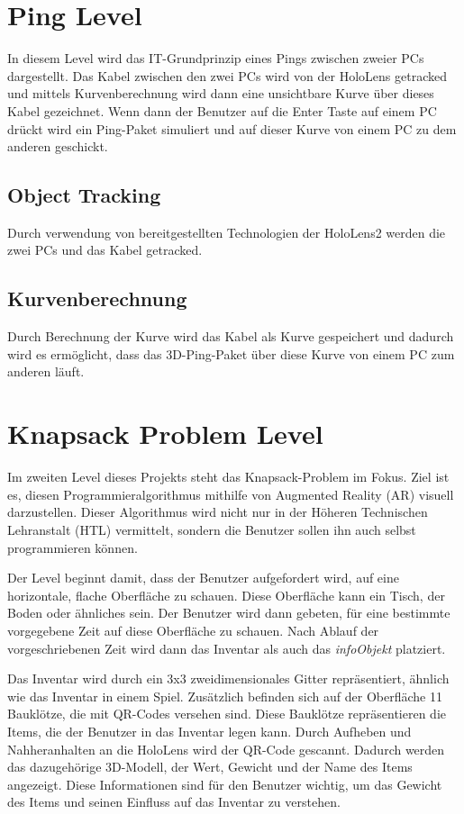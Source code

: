 \section{Ping Level}
In diesem Level wird das IT-Grundprinzip eines Pings zwischen zweier
PCs dargestellt. Das Kabel zwischen den zwei PCs wird von der
HoloLens getracked und mittels Kurvenberechnung wird dann eine
unsichtbare Kurve über dieses Kabel gezeichnet. Wenn dann der Benutzer
auf die Enter Taste auf einem PC drückt wird ein Ping-Paket simuliert
und auf dieser Kurve von einem PC zu dem anderen geschickt.

\subsection{Object Tracking}
Durch verwendung von bereitgestellten Technologien der HoloLens2
werden die zwei PCs und das Kabel getracked.

\subsection{Kurvenberechnung}
Durch Berechnung der Kurve wird das Kabel als Kurve gespeichert
und dadurch wird es ermöglicht, dass das 3D-Ping-Paket über diese
Kurve von einem PC zum anderen läuft.

\section{Knapsack Problem Level}
Im zweiten Level dieses Projekts steht das Knapsack-Problem im Fokus.
Ziel ist es, diesen Programmieralgorithmus mithilfe von Augmented Reality
(AR) visuell darzustellen. Dieser Algorithmus wird nicht nur in der Höheren
Technischen Lehranstalt (HTL) vermittelt, sondern die Benutzer sollen
ihn auch selbst programmieren können.

Der Level beginnt damit, dass der Benutzer aufgefordert wird, auf eine
horizontale, flache Oberfläche zu schauen. Diese Oberfläche kann ein Tisch,
der Boden oder ähnliches sein. Der Benutzer wird dann gebeten, für eine bestimmte
vorgegebene Zeit auf diese Oberfläche zu schauen. Nach Ablauf der vorgeschriebenen
Zeit wird dann das Inventar als auch das \textit{infoObjekt} platziert.

Das Inventar wird durch ein 3x3 zweidimensionales Gitter repräsentiert, ähnlich
wie das Inventar in einem Spiel. Zusätzlich befinden sich auf der Oberfläche 11 Bauklötze,
die mit QR-Codes versehen sind. Diese Bauklötze repräsentieren die Items, die der Benutzer
in das Inventar legen kann. Durch Aufheben und Nahheranhalten an die HoloLens wird der QR-Code gescannt.
Dadurch werden das dazugehörige 3D-Modell, der Wert, Gewicht und der Name des Items angezeigt.
Diese Informationen sind für den Benutzer wichtig, um das Gewicht des Items und
seinen Einfluss auf das Inventar zu verstehen.

